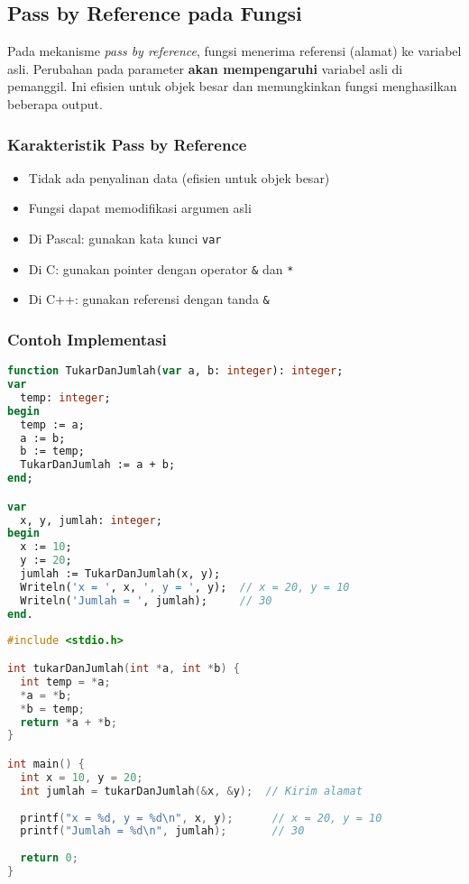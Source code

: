 \documentclass[../main.tex]{subfiles}
\begin{document}
\subsection{Pass by Reference pada Fungsi}
Pada mekanisme \emph{pass by reference}, fungsi menerima referensi (alamat) ke variabel asli. Perubahan pada parameter \textbf{akan mempengaruhi} variabel asli di pemanggil. Ini efisien untuk objek besar dan memungkinkan fungsi menghasilkan beberapa output.

\subsubsection{Karakteristik Pass by Reference}
\begin{itemize}
  \item Tidak ada penyalinan data (efisien untuk objek besar)
  \item Fungsi dapat memodifikasi argumen asli
  \item Di Pascal: gunakan kata kunci \texttt{var}
  \item Di C: gunakan pointer dengan operator \texttt{\&} dan \texttt{*}
  \item Di C++: gunakan referensi dengan tanda \texttt{\&}
\end{itemize}

\subsubsection{Contoh Implementasi}
\begin{lstlisting}[language=Pascal, caption={Pass by reference (Pascal)}]
function TukarDanJumlah(var a, b: integer): integer;
var
  temp: integer;
begin
  temp := a;
  a := b;
  b := temp;
  TukarDanJumlah := a + b;
end;

var
  x, y, jumlah: integer;
begin
  x := 10;
  y := 20;
  jumlah := TukarDanJumlah(x, y);
  Writeln('x = ', x, ', y = ', y);  // x = 20, y = 10
  Writeln('Jumlah = ', jumlah);     // 30
end.
\end{lstlisting}

\begin{lstlisting}[language=C, caption={Pass by reference via pointer (C)}]
#include <stdio.h>

int tukarDanJumlah(int *a, int *b) {
  int temp = *a;
  *a = *b;
  *b = temp;
  return *a + *b;
}

int main() {
  int x = 10, y = 20;
  int jumlah = tukarDanJumlah(&x, &y);  // Kirim alamat
  
  printf("x = %d, y = %d\n", x, y);      // x = 20, y = 10
  printf("Jumlah = %d\n", jumlah);       // 30
  
  return 0;
}
\end{lstlisting}
\end{document}
